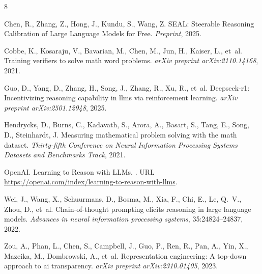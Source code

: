 \documentclass{article}
\begin{document}

\begin{thebibliography}{8}

Chen, R., Zhang, Z., Hong, J., Kundu, S., Wang, Z.
\newblock SEAL: Steerable Reasoning Calibration of Large Language Models for Free.
\newblock \emph{Preprint}, 2025.

Cobbe, K., Kosaraju, V., Bavarian, M., Chen, M., Jun, H., Kaiser, L., et~al.
\newblock Training verifiers to solve math word problems.
\newblock \emph{arXiv preprint arXiv:2110.14168}, 2021.

Guo, D., Yang, D., Zhang, H., Song, J., Zhang, R., Xu, R., et~al.
\newblock Deepseek-r1: Incentivizing reasoning capability in llms via reinforcement learning.
\newblock \emph{arXiv preprint arXiv:2501.12948}, 2025.

Hendrycks, D., Burns, C., Kadavath, S., Arora, A., Basart, S., Tang, E., Song, D., Steinhardt, J.
\newblock Measuring mathematical problem solving with the math dataset.
\newblock \emph{Thirty-fifth Conference on Neural Information Processing Systems Datasets and Benchmarks Track}, 2021.

OpenAI.
\newblock Learning to Reason with LLMs.
.
\newblock URL \url{https://openai.com/index/learning-to-reason-with-llms}.

Wei, J., Wang, X., Schuurmans, D., Bosma, M., Xia, F., Chi, E., Le, Q.~V., Zhou, D., et~al.
\newblock Chain-of-thought prompting elicits reasoning in large language models.
\newblock \emph{Advances in neural information processing systems}, 35:24824--24837, 2022.

Zou, A., Phan, L., Chen, S., Campbell, J., Guo, P., Ren, R., Pan, A., Yin, X., Mazeika, M., Dombrowski, A., et~al.
\newblock Representation engineering: A top-down approach to ai transparency.
\newblock \emph{arXiv preprint arXiv:2310.01405}, 2023.

\end{thebibliography}
\end{document}
